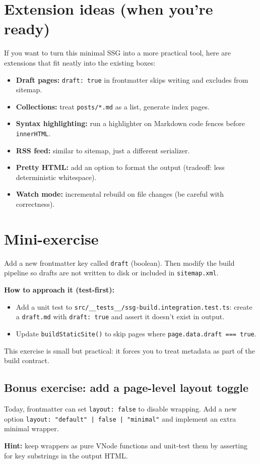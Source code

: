 \section{Extension ideas (when you're ready)}
If you want to turn this minimal SSG into a more practical tool, here are extensions that fit neatly into the existing boxes:

\begin{itemize}
  \item \textbf{Draft pages:} \texttt{draft: true} in frontmatter skips writing and excludes from sitemap.
  \item \textbf{Collections:} treat \texttt{posts/*.md} as a list, generate index pages.
  \item \textbf{Syntax highlighting:} run a highlighter on Markdown code fences before \texttt{innerHTML}.
  \item \textbf{RSS feed:} similar to sitemap, just a different serializer.
  \item \textbf{Pretty HTML:} add an option to format the output (tradeoff: less deterministic whitespace).
  \item \textbf{Watch mode:} incremental rebuild on file changes (be careful with correctness).
\end{itemize}

\section{Mini-exercise}
Add a new frontmatter key called \texttt{draft} (boolean).
Then modify the build pipeline so drafts are not written to disk or included in \texttt{sitemap.xml}.

\textbf{How to approach it (test-first):}

\begin{itemize}
  \item Add a unit test to \texttt{src/\_\_tests\_\_/ssg-build.integration.test.ts}:
    create a \texttt{draft.md} with \texttt{draft: true} and assert it doesn't exist in output.
  \item Update \texttt{buildStaticSite()} to skip pages where \texttt{page.data.draft === true}.
\end{itemize}

This exercise is small but practical: it forces you to treat metadata as part of the build contract.

\subsection{Bonus exercise: add a page-level layout toggle}
Today, frontmatter can set \texttt{layout: false} to disable wrapping.
Add a new option \texttt{layout: "default" | false | "minimal"} and implement an extra minimal wrapper.

	\textbf{Hint:}
keep wrappers as pure VNode functions and unit-test them by asserting for key substrings in the output HTML.
